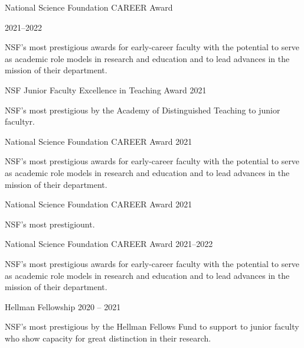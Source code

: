 \documentclass[margin,line]{resume}
\newcommand{\myDescription}[1]{%
  \parbox{.85\textwidth}{#1}\medskip}
\renewcommand{\myDescription}[1]{{#1}\medskip}
\renewcommand{\myDescription}[1]{%
  \parbox{.85\textwidth}{\strut #1}\medskip}
\begin{document}
\begin{resume}


National Science Foundation {CAREER} Award\strut%
\hfill%
{2021--2022}\par
\myDescription{{NSF}'s most prestigious awards for early-career faculty with the potential to serve as academic role models in research and education and to lead advances in the mission of their department.}

{NSF} Junior Faculty Excellence in Teaching Award%
\hfill%
{2021}\par
\myDescription{{NSF}'s most prestigious by the Academy of Distinguished Teaching to junior facultyr.}

National Science Foundation {CAREER} Award
\hfill%
{2021}\par
\myDescription{{NSF}'s most prestigious awards for early-career faculty with the potential to serve as academic role models in research and education and to lead advances in the mission of their department.}


National Science Foundation {CAREER} Award
\hfill%
{2021}\par
\myDescription{{NSF}'s most prestigiount.}

National Science Foundation {CAREER} Award
\hfill%
{2021--2022}\par
\myDescription{{NSF}'s most prestigious awards for early-career faculty with the potential to serve as academic role models in research and education and to lead advances in the mission of their department.}

Hellman Fellowship
\hfill%
{2020 -- 2021}\par
\myDescription{{NSF}'s most prestigious by the Hellman Fellows Fund to support to junior faculty who show capacity for great distinction in their research. }

\end{resume}
\end{document}
